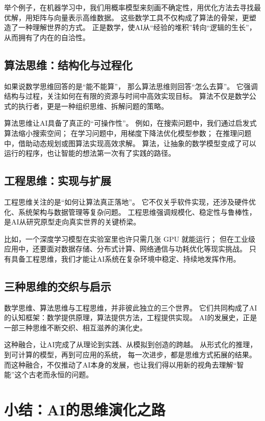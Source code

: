 举个例子，在机器学习中，我们用概率模型来刻画不确定性，用优化方法去寻找最优解，用矩阵与向量表示高维数据。  
这些数学工具不仅构成了算法的骨架，更塑造了一种理解世界的方式。  
正是数学，使AI从“经验的堆积”转向“逻辑的生长”，从而拥有了内在的自洽性。

\subsection{算法思维：结构化与过程化}

如果说数学思维回答的是“能不能算”，  
那么算法思维则回答“怎么去算”。  
它强调结构与过程，关注如何在有限的资源与时间中高效实现目标。  
算法不仅是数学公式的执行者，更是一种组织思维、拆解问题的策略。

算法思维让AI具备了真正的“可操作性”。  
例如，在搜索问题中，我们通过启发式算法缩小搜索空间；  
在学习问题中，用梯度下降法优化模型参数；  
在推理问题中，借助动态规划或图算法实现高效求解。  
算法，让抽象的数学模型变成了可以运行的程序，也让智能的想法第一次有了实践的路径。

\subsection{工程思维：实现与扩展}

工程思维关注的是“如何让算法真正落地”。  
它不仅关乎软件实现，还涉及硬件优化、系统架构与数据管理等复杂问题。  
工程思维强调规模化、稳定性与鲁棒性，是AI从研究原型走向真实世界的关键桥梁。

比如，一个深度学习模型在实验室里也许只需几张 GPU 就能运行；  
但在工业级应用中，还要面对数据存储、分布式计算、网络通信与功耗优化等现实挑战。  
只有具备工程思维，我们才能让AI系统在复杂环境中稳定、持续地发挥作用。

\subsection{三种思维的交织与启示}

数学思维、算法思维与工程思维，并非彼此独立的三个世界。  
它们共同构成了AI的认知框架：数学提供原理，算法提供方法，工程提供实现。  
AI的发展史，正是一部三种思维不断交织、相互滋养的演化史。

这种融合，让AI完成了从理论到实践、从模拟到创造的跨越。  
从形式化的推理，到可计算的模型，再到可应用的系统，  
每一次进步，都是思维方式拓展的结果。  
而这种融合，不仅推动了AI本身的发展，也让我们得以用新的视角去理解“智能”这个古老而永恒的问题。

\section{小结：AI的思维演化之路}

